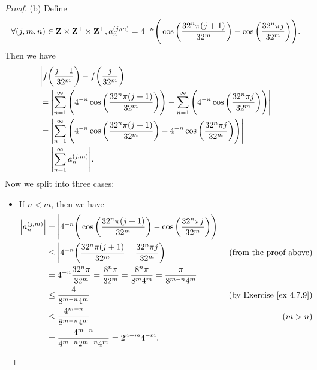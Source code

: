 \begin{proof}{(b)}
    Define
    \[
        \forall (j, m, n) \in \mathbf{Z} \times \mathbf{Z}^+ \times \mathbf{Z}^+, a_n^{(j, m)} = 4^{-n} \Bigg(\cos\bigg(\frac{32^n \pi (j + 1)}{32^m}\bigg) - \cos\bigg(\frac{32^n \pi j}{32^m}\bigg)\Bigg).
    \]
    Then we have
    \begin{align*}
         & \abs{f\bigg(\frac{j + 1}{32^m}\bigg) - f\bigg(\frac{j}{32^m}\bigg)}                                                                                                           \\
         & = \abs{\sum_{n = 1}^\infty \Bigg(4^{-n} \cos\bigg(\frac{32^n \pi (j + 1)}{32^m}\bigg)\Bigg) - \sum_{n = 1}^\infty \Bigg(4^{-n} \cos\bigg(\frac{32^n \pi j}{32^m}\bigg)\Bigg)} \\
         & = \abs{\sum_{n = 1}^\infty \Bigg(4^{-n} \cos\bigg(\frac{32^n \pi (j + 1)}{32^m}\bigg) - 4^{-n} \cos\bigg(\frac{32^n \pi j}{32^m}\bigg)\Bigg)}                                 \\
         & = \abs{\sum_{n = 1}^\infty a_n^{(j, m)}}.
    \end{align*}
    Now we split into three cases:
    \begin{itemize}
        \item If \(n < m\), then we have
              \begin{align*}
                  \left\lvert a_n^{(j, m)}\right\rvert & = \left\lvert4^{-n} \Bigg(\cos\bigg(\frac{32^n \pi (j + 1)}{32^m}\bigg) - \cos\bigg(\frac{32^n \pi j}{32^m}\bigg)\Bigg)\right\rvert                                       \\
                                     & \leq \left\lvert4^{-n} \bigg(\frac{32^n \pi (j + 1)}{32^m} - \frac{32^n \pi j}{32^m}\bigg)\right\rvert                              & \text{(from the proof above)}       \\
                                     & = 4^{-n} \frac{32^n \pi}{32^m} = \frac{8^n \pi}{32^m} = \frac{8^n \pi}{8^m 4^m} = \frac{\pi}{8^{m - n} 4^m}                                              \\
                                     & \leq \frac{4}{8^{m - n} 4^m}                                                                                       & \text{(by Exercise \ref{ex 4.7.9})} \\
                                     & \leq \frac{4^{m - n}}{8^{m - n} 4^m}                                                                               & (m > n)                             \\
                                     & = \frac{4^{m - n}}{4^{m - n} 2^{m - n} 4^m} = 2^{n - m} 4^{-m}.
              \end{align*}

\end{itemize}
\end{proof}
